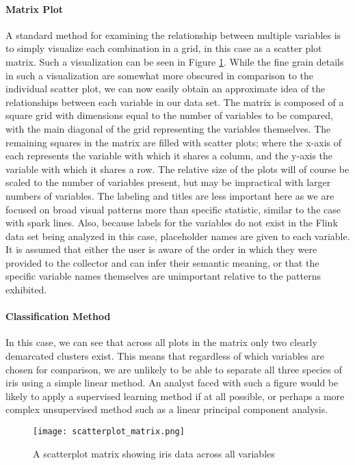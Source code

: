 \paragraph{Matrix Plot}
A standard method for examining the relationship between multiple variables is to simply visualize each combination in a grid, in this case as a scatter plot matrix. Such a visualization can be seen in Figure \ref{fig:scatterplot_matrix}. While the fine grain details in such a visualization are somewhat more obscured in comparison to the individual scatter plot, we can now easily obtain an approximate idea of the relationships between each variable in our data set. The matrix is composed of a square grid with dimensions equal to the number of variables to be compared, with the main diagonal of the grid representing the variables themselves. The remaining squares in the matrix are filled with scatter plots; where the x-axis of each represents the variable with which it shares a column, and the y-axis the variable with which it shares a row. The relative size of the plots will of course be scaled to the number of variables present, but may be impractical with larger numbers of variables. The labeling and titles are less important here as we are focused on broad visual patterns more than specific statistic, similar to the case with spark lines. Also, because labels for the variables do not exist in the Flink data set being analyzed in this case, placeholder names are given to each variable. It is assumed that either the user is aware of the order in which they were provided to the collector and can infer their semantic meaning, or that the specific variable names themselves are unimportant relative to the patterns exhibited.

\paragraph{Classification Method}
In this case, we can see that across all plots in the matrix only two clearly demarcated clusters exist. This means that regardless of which variables are chosen for comparison, we are unlikely to be able to separate all three species of iris using a simple linear method. An analyst faced with such a figure would be likely to apply a supervised learning method if at all possible, or perhaps a more complex unsupervised method such as a linear principal component analysis. 

\begin{figure}
	\centering
	\label{fig:scatterplot_matrix}
	\texttt{[image: scatterplot\_matrix.png]}
	\caption{A scatterplot matrix showing iris data across all variables}
\end{figure}
